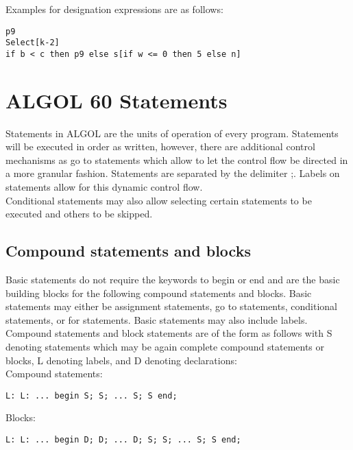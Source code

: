 \documentclass{article}
\begin{document}
Examples for designation expressions are as follows:\\

\begin{lstlisting}[language={[60]algol}]
p9
Select[k-2]
if b < c then p9 else s[if w <= 0 then 5 else n]
\end{lstlisting}

\newpage

\section{ALGOL 60 Statements} \label{statement}
Statements in ALGOL are the units of operation of every program. Statements will be executed in order as written, however, there are additional control mechanisms as go to statements which allow to let the control flow be directed in a more granular fashion. Statements are separated by the delimiter ;. Labels on statements allow for this dynamic control flow.\\
Conditional statements may also allow selecting certain statements to be executed and others to be skipped.\\

\subsection{Compound statements and blocks} \label{compStatsBlocks}
Basic statements do not require the keywords to begin or end and are the basic building blocks for the following compound statements and blocks. Basic statements may either be assignment statements, go to statements, conditional statements, or for statements. Basic statements may also include labels.\\

Compound statements and block statements are of the form as follows with S denoting statements which may be again complete compound statements or blocks, L denoting labels, and D denoting declarations:\\

Compound statements:\\
\begin{lstlisting}[language={[60]algol}]
L: L: ... begin S; S; ... S; S end;
\end{lstlisting}

Blocks:\\
\begin{lstlisting}[language={[60]algol}]
L: L: ... begin D; D; ... D; S; S; ... S; S end;
\end{lstlisting}
\end{document}
